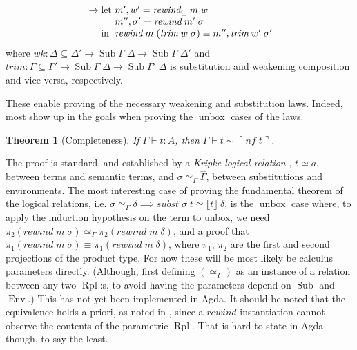 \documentclass{article}
\newtheorem{theorem}{Theorem}
\DeclareMathOperator\unbox{unbox}
\begin{document}
\begin{itemize}
\begin{align*}
    &&&\rightarrow
    \begin{array}[t]{@{}l@{}l@{}}
      \text{let } & m' , w' = \textit{rewind}_\subseteq \; m \; w \\
      & m'' , \sigma' = \textit{rewind} \; m' \; \sigma \\
      \text{in } & \textit{rewind} \; m \; (\textit{trim} \; w \; \sigma) \equiv m'' , \textit{trim} \; w' \; \sigma'
    \end{array}
  \end{align*}
  where $\textit{wk} : \Delta\subseteq\Delta' \rightarrow \operatorname{Sub} \Gamma \; \Delta \rightarrow \operatorname{Sub} \Gamma \; \Delta'$ and
  $\textit{trim} : \Gamma\subseteq\Gamma' \rightarrow \operatorname{Sub} \Gamma \; \Delta \rightarrow \operatorname{Sub} \Gamma' \; \Delta$
  is substitution and weakening composition and vice versa, respectively.
\end{itemize}
These enable proving of the necessary weakening and substitution laws.
Indeed, most show up in the goals when proving the $\unbox$ cases of the laws.

\begin{theorem}[Completeness]
  If $\Gamma \vdash t : A$, then $\Gamma \vdash t \sim \ulcorner \textit{nf} \; t \urcorner$.
\end{theorem}

The proof is standard,
and established by a \emph{Kripke logical relation} \cite{kovacs17},
$t \simeq a$, between terms and semantic terms,
and $\sigma \simeq_\Gamma \hat\Gamma$, between substitutions and environments.
The most interesting case of proving the fundamental theorem of the logical relations,
i.e. $\sigma \simeq_\Gamma \delta \implies \textit{subst} \; \sigma \; t \simeq \llbracket t \rrbracket \; \delta$,
is the $\unbox$ case
where, to apply the induction hypothesis on the term to unbox,
we need $\pi_2 (\textit{rewind} \; m \; \sigma) \simeq_\Gamma \pi_2 (\textit{rewind} \; m \; \delta)$,
and a proof that $\pi_1 (\textit{rewind} \; m \; \sigma) \equiv \pi_1 (\textit{rewind} \; m \; \delta)$,
where $\pi_1$, $\pi_2$ are the first and second projections of the product type.
For now these will be most likely be calculus parameters directly.
(Although, first defining $(\simeq_\Gamma)$ as an instance of a relation
between any two $\operatorname{Rpl}$:s,
to avoid having the parameters depend on $\operatorname{Sub}$ and $\operatorname{Env}$.)
This has not yet been implemented in Agda.
It should be noted that the equivalence holds a priori,
as noted in  \cite{wadler89},
since a $\textit{rewind}$ instantiation cannot observe
the contents of the parametric $\operatorname{Rpl}$.
That is hard to state in Agda though, to say the least.
\end{document}
